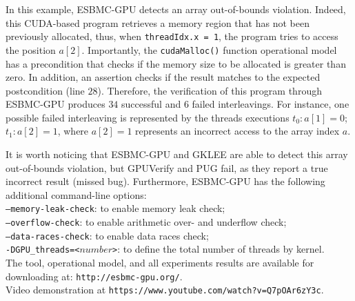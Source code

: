 \documentclass{llncs}
\begin{document}
\begin{enumerate}
In this example, ESBMC-GPU detects an array out-of-bounds violation. Indeed, this CUDA-based program retrieves a memory region that has not been previously allocated, thus, when {\tt threadIdx.x = 1}, the program tries to access the position $a[2]$. Importantly, the {\tt cudaMalloc()} function operational model has a precondition that checks if the memory size to be allocated is greater than zero. In addition, an assertion checks if the result matches to the expected postcondition (line $28$). Therefore, the verification of this program through ESBMC-GPU produces $34$ successful and $6$ failed interleavings. For instance, one possible failed interleaving is represented by the threads executions $t_0 : a[1] = 0$; $t_1 : a[2] = 1$, where $a[2] = 1$ represents an incorrect access to the array index $a$.

It is worth noticing that ESBMC-GPU and GKLEE are able to detect this array out-of-bounds violation, but GPUVerify and PUG fail, as they report a true incorrect result (missed bug). Furthermore, ESBMC-GPU has the following additional command-line options: \\

\texttt{--memory-leak-check}: to enable memory leak check; \\
\texttt{--overflow-check}: to enable arithmetic over- and underflow check; \\
\texttt{--data-races-check}: to enable data races check; \\
\texttt{-DGPU\_threads=<$number$>}: to define the total number of threads by kernel. \\

The tool, operational model, and all experiments results are available for downloading at: \texttt{http://esbmc-gpu.org/}.\\

Video demonstration at \texttt{https://www.youtube.com/watch?v=Q7pOAr6zY3c}.
\end{enumerate}
\end{document}
